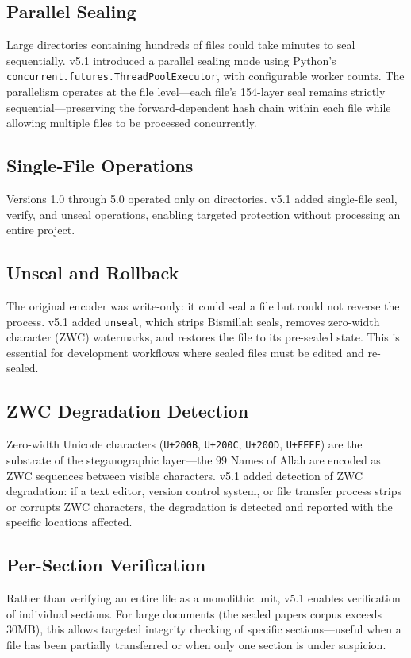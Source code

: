 \documentclass[11pt,a4paper]{article}
\begin{document}
\subsection{Parallel Sealing}
Large directories containing hundreds of files could take minutes to seal sequentially. v5.1 introduced a parallel sealing mode using Python's \texttt{concurrent.futures.ThreadPoolExecutor}, with configurable worker counts. The parallelism operates at the file level---each file's 154-layer seal remains strictly sequential---preserving the forward-dependent hash chain within each file while allowing multiple files to be processed concurrently.

\subsection{Single-File Operations}
Versions 1.0 through 5.0 operated only on directories. v5.1 added single-file seal, verify, and unseal operations, enabling targeted protection without processing an entire project.

\subsection{Unseal and Rollback}
The original encoder was write-only: it could seal a file but could not reverse the process. v5.1 added \texttt{unseal}, which strips Bismillah seals, removes zero-width character (ZWC) watermarks, and restores the file to its pre-sealed state. This is essential for development workflows where sealed files must be edited and re-sealed.

\subsection{ZWC Degradation Detection}
Zero-width Unicode characters (\texttt{U+200B}, \texttt{U+200C}, \texttt{U+200D}, \texttt{U+FEFF}) are the substrate of the steganographic layer---the 99 Names of Allah are encoded as ZWC sequences between visible characters. v5.1 added detection of ZWC degradation: if a text editor, version control system, or file transfer process strips or corrupts ZWC characters, the degradation is detected and reported with the specific locations affected.

\subsection{Per-Section Verification}
Rather than verifying an entire file as a monolithic unit, v5.1 enables verification of individual sections. For large documents (the sealed papers corpus exceeds 30MB), this allows targeted integrity checking of specific sections---useful when a file has been partially transferred or when only one section is under suspicion.
\end{document}
